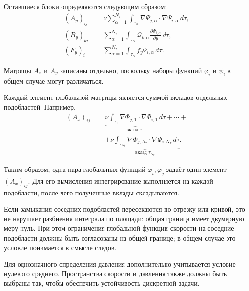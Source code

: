 \documentclass[a4paper,14pt]{extarticle}
\begin{document}
	Оставшиеся блоки определяются следующим образом:
	\[
	\begin{aligned}
		(A_y)_{ij}
		&=
		\nu\sum_{\alpha=1}^{N_\tau}
		\int_{\tau_\alpha}
		\nabla\Psi_{j,\alpha}
		\cdot\nabla\Psi_{i,\alpha}\,d\tau,
		\\
		(B_y)_{ki}
		&=
		\sum_{\alpha=1}^{N_\tau}
		\int_{\tau_\alpha}
		\mathcal Q_{k,\alpha}
		\frac{\partial\Psi_{i,\alpha}}{\partial y}\,d\tau,
		\\
		(F_y)_i
		&=
		\sum_{\alpha=1}^{N_\tau}
		\int_{\tau_\alpha}
		f_y\Psi_{i,\alpha}\,d\tau.
	\end{aligned}
	\]
	
	Матрицы $A_x$ и $A_y$ записаны отдельно, поскольку наборы функций
	$\varphi_i$ и $\psi_i$ в общем случае могут различаться.
	
	\medskip
	
	Каждый элемент глобальной матрицы является суммой вкладов отдельных
	подобластей. Например,
	\[
	\begin{aligned}
		(A_x)_{ij}
		={}&
		\underbrace{
			\nu\int_{\tau_1}
			\nabla\Phi_{j,1}\cdot\nabla\Phi_{i,1}\,d\tau
		}_{\text{вклад }\tau_1}
		+\cdots+
		\\
		&+
		\underbrace{
			\nu\int_{\tau_{N_\tau}}
			\nabla\Phi_{j,N_\tau}
			\cdot\nabla\Phi_{i,N_\tau}\,d\tau
		}_{\text{вклад }\tau_{N_\tau}}.
	\end{aligned}
	\]
	
	Таким образом, одна пара глобальных функций $\varphi_i,\varphi_j$
	задаёт один элемент $(A_x)_{ij}$. Для его вычисления интегрирование
	выполняется на каждой подобласти, после чего полученные вклады
	складываются.
	
	Если замыкания соседних подобластей пересекаются по отрезку или
	кривой, это не нарушает разбиения интеграла по площади: общая граница
	имеет двумерную меру нуль. При этом ограничения глобальной функции
	скорости на соседние подобласти должны быть согласованы на общей
	границе; в общем случае это условие понимается в смысле следов.
	
	Для однозначного определения давления дополнительно учитывается
	условие нулевого среднего. Пространства скорости и давления также
	должны быть выбраны так, чтобы обеспечить устойчивость дискретной
	задачи.
\end{document}
